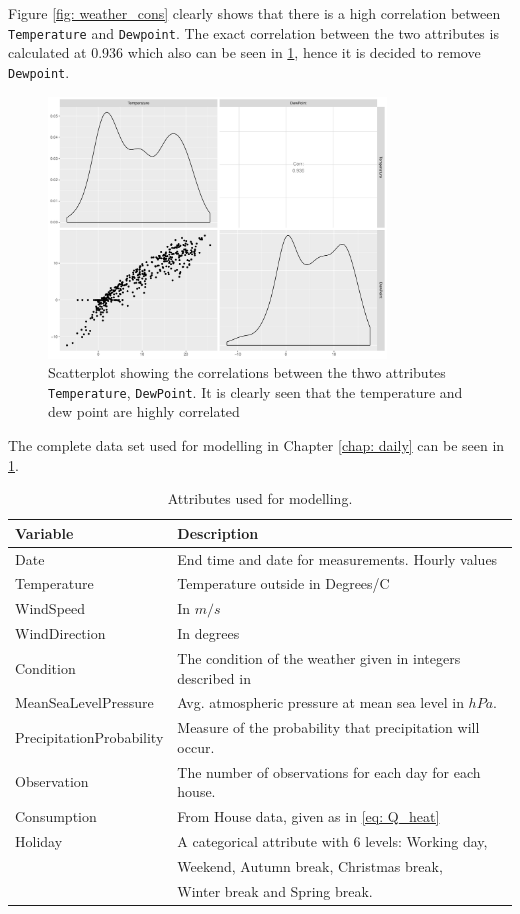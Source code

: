 \noindent Figure \ref{fig: weather_cons} clearly shows that there is a high correlation between \texttt{Temperature} and \texttt{Dewpoint}. The exact correlation between the two attributes is calculated at 0.936 which also can be seen in \cref{fig: gg_cor}, hence it is decided to remove \texttt{Dewpoint}. 
\begin{figure}[H]
    \centering
    \includegraphics[width=0.8\textwidth]{../../../figures/gg_cor.pdf}
    \caption{Scatterplot showing the correlations between the thwo attributes \texttt{Temperature}, \texttt{DewPoint}. It is clearly seen that the temperature and dew point are highly correlated}
    \label{fig: gg_cor}
\end{figure}
 
\noindent The complete data set used for modelling in Chapter \ref{chap: daily} can be seen in \cref{tab: modeldata}.
\begin{table}[H]
    \centering
    \begin{tabular}{ll}
     \hline
     \textbf{Variable} & \textbf{Description} \\
    \hline
    \hline
    Date  &  End time and date for measurements. Hourly values\\
    Temperature  &  Temperature outside in Degrees/C \\
    WindSpeed  &  In $m/s$\\ 
    WindDirection  &  In degrees\\
    Condition  & The condition of the weather given in integers described in \cite{condition}\\
    MeanSeaLevelPressure & Avg. atmospheric pressure at mean sea level in $hPa$.\\
    PrecipitationProbability & Measure of the probability that precipitation will occur. \\
    Observation & The number of observations for each day for each house.\\
    Consumption & From House data, given as in \cref{eq: Q_heat} \\
    Holiday & A categorical attribute with 6 levels: Working day, \\ & Weekend, Autumn break, Christmas break, \\ & Winter break and Spring break.\\
    \hline
    \end{tabular}
    \caption{Attributes used for modelling.}
    \label{tab: modeldata}
\end{table}   

